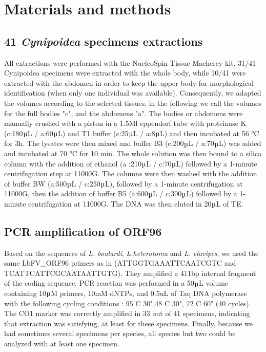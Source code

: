 \section{Materials and methods}


\subsection{41 \textit{Cynipoidea} specimens extractions}

All extractions were performed with the NucleoSpin Tissue Macherey kit. 31/41 Cynipoidea specimens were extracted with the whole body, while 10/41 were extracted with the abdomen in order to keep the upper body for morphological identification (when only one individual was available). Consequently, we adapted the volumes according to the selected tissues, in the following we call the volumes for the full bodies "c", and the abdomens "a". The bodies or abdomens were manually crushed with a piston in a 1.5Ml eppendorf tube with proteinase K (c:180$\micro$L / a:60$\micro$L) and T1 buffer (c:25$\micro$L / a:8$\micro$L) and then incubated at 56 °C for 3h. The lysates were then mixed and buffer B3 (c:200$\micro$L / a:70$\micro$L) was added and incubated at 70 °C for 10 min. The whole solution was then bound to a silica column with the addition of ethanol (a :210$\micro$L / c:70$\micro$L) followed by a 1-minute centrifugation step at 11000G. The columns were then washed with the addition of buffer BW (a:500$\micro$L / c:250$\micro$L), followed by a 1-minute centrifugation at 11000G, then the addition of buffer B5 (a:600$\micro$L / c:300$\micro$L) followed by a 1-minute centrifugation at 11000G. The DNA was then eluted in 20$\micro$L of TE. 

\subsection{PCR amplification of ORF96}
Based on the sequences of \textit{L. boulardi}, \textit{L.heterotoma} and \textit{L. clavipes}, we used the same LbFV\_ORF96 primers as in \cite{di_giovanni_behavior-manipulating_2020} (ATTGGTGAAATTCAATCGTC and TCATTCATTCGCAATAATTGTG). They amplified a 411bp internal fragment of the coding sequence. PCR reaction was performed in a 50$\micro$L volume containing 10$\micro$M primers, 10mM dNTPs, and 0.5uL of Taq DNA polymerase with the following cycling conditions : 95 C 30",48 C 30", 72 C 60" (40 cycles). The CO1 marker was correctly amplified in 33 out of 41 specimens, indicating that extraction was satisfying, at least for these specimens. Finally, because we had sometimes several specimens per species, all species but two could be analyzed with at least one specimen.

